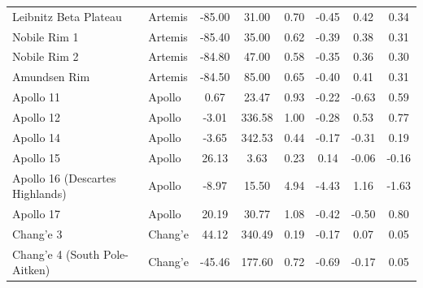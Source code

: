 \begin{table}[t]
\begin{tabular*}{\textwidth}{@{\extracolsep\fill}llcccccc@{}}
\raggedright\footnotesize Leibnitz Beta Plateau & \footnotesize Artemis & \footnotesize -85.00 & \footnotesize 31.00 & \footnotesize 0.70 & \footnotesize -0.45 & \footnotesize 0.42 & \footnotesize 0.34 \\
\raggedright\footnotesize Nobile Rim 1 & \footnotesize Artemis & \footnotesize -85.40 & \footnotesize 35.00 & \footnotesize 0.62 & \footnotesize -0.39 & \footnotesize 0.38 & \footnotesize 0.31 \\
\raggedright\footnotesize Nobile Rim 2 & \footnotesize Artemis & \footnotesize -84.80 & \footnotesize 47.00 & \footnotesize 0.58 & \footnotesize -0.35 & \footnotesize 0.36 & \footnotesize 0.30 \\
\raggedright\footnotesize Amundsen Rim & \footnotesize Artemis & \footnotesize -84.50 & \footnotesize 85.00 & \footnotesize 0.65 & \footnotesize -0.40 & \footnotesize 0.41 & \footnotesize 0.31 \\
\raggedright\footnotesize Apollo 11 & \footnotesize Apollo & \footnotesize 0.67 & \footnotesize 23.47 & \footnotesize 0.93 & \footnotesize -0.22 & \footnotesize -0.63 & \footnotesize 0.59 \\
\raggedright\footnotesize Apollo 12 & \footnotesize Apollo & \footnotesize -3.01 & \footnotesize 336.58 & \footnotesize 1.00 & \footnotesize -0.28 & \footnotesize 0.53 & \footnotesize 0.77 \\
\raggedright\footnotesize Apollo 14 & \footnotesize Apollo & \footnotesize -3.65 & \footnotesize 342.53 & \footnotesize 0.44 & \footnotesize -0.17 & \footnotesize -0.31 & \footnotesize 0.19 \\
\raggedright\footnotesize Apollo 15 & \footnotesize Apollo & \footnotesize 26.13 & \footnotesize 3.63 & \footnotesize 0.23 & \footnotesize 0.14 & \footnotesize -0.06 & \footnotesize -0.16 \\
\raggedright\footnotesize Apollo 16 (Descartes Highlands) & \footnotesize Apollo & \footnotesize -8.97 & \footnotesize 15.50 & \footnotesize 4.94 & \footnotesize -4.43 & \footnotesize 1.16 & \footnotesize -1.63 \\
\raggedright\footnotesize Apollo 17 & \footnotesize Apollo & \footnotesize 20.19 & \footnotesize 30.77 & \footnotesize 1.08 & \footnotesize -0.42 & \footnotesize -0.50 & \footnotesize 0.80 \\
\raggedright\footnotesize Chang'e 3 & \footnotesize Chang'e & \footnotesize 44.12 & \footnotesize 340.49 & \footnotesize 0.19 & \footnotesize -0.17 & \footnotesize 0.07 & \footnotesize 0.05 \\
\raggedright\footnotesize Chang'e 4 (South Pole-Aitken) & \footnotesize Chang'e & \footnotesize -45.46 & \footnotesize 177.60 & \footnotesize 0.72 & \footnotesize -0.69 & \footnotesize -0.17 & \footnotesize 0.05 \\

\end{tabular*}
\end{table}
